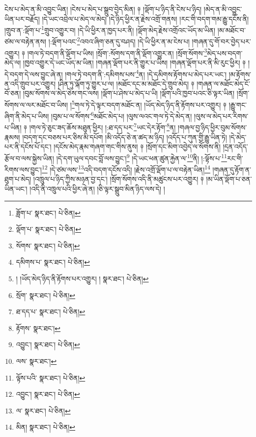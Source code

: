 ངེས་པ་མེད་ན་མི་འབྱུང་ཡིན། །ངེས་པ་མེད་པ་སྒྲུབ་བྱེད་མིན། ༈ །ལྡོག་པ་ཉིད་ནི་ངེས་པ་ཉིད། །མེད་ན་མི་འབྱུང་ཡིན་པར་བརྗོད། །དེ་ཡང་འབྲེལ་པ་མེད་ལ་མེད། །དེ་ཉིད་ཕྱིར་ན་རྗེས་འགྲོ་གནས། །རང་གི་བདག་གམ་རྒྱུ་དངོས་ནི། །གྲུབ་ན་:ལྡོག་པ་\footnote{ཟློག་པ་  སྣར་ཐང་།  པེ་ཅིན། }གྲུབ་འགྱུར་བ། །དེ་ཡི་ཕྱིར་ན་ཁྱད་པར་ནི། །ལྡོག་མེད་རྗེས་འགྲོའང་ཡོད་མ་ཡིན། །མ་མཐོང་བ་ཙམ་ལ་བརྟེན་ནས། །:ལྡོག་པའང་\footnote{ལྡོག་པ་  སྣར་ཐང་།  པེ་ཅིན། }འབའ་ཞིག་ཅན་དུ་བཤད། །དེ་ཡི་ཕྱིར་ན་མ་ངེས་པ། །གཞན་དུ་གོ་བར་བྱེད་པར་འགྱུར། ༈ །གལ་ཏེ་བདག་ནི་ལྡོག་པ་ཡིས། །སྲོག་:སོགས་དག་ནི་ལྡོག་འགྱུར་ན། །སྲོག་སོགས་\footnote{སོགས་  སྣར་ཐང་།  པེ་ཅིན། }མེད་པས་བདག་མེད་ལ། །ཁྱབ་འགྱུར་དེ་ཡང་ཡོད་མ་ཡིན། །གཞན་ལྡོག་པར་ནི་གྱུར་པ་ཡིས། །གཞན་ལྡོག་པར་ནི་མི་རུང་ཕྱིར། ༈ །དེ་བདག་དེ་ལས་བྱུང་ཞེ་ན། །གལ་ཏེ་བདག་ནི་:དམིགས་པས་\footnote{དམིགས་པ་  སྣར་ཐང་།  པེ་ཅིན། }ན། །དེ་དམིགས་རྟོགས་པ་མེད་པར་ཡང་། །མ་རྟོགས་ན་འདི་གྲུབ་པར་འགྱུར། །ཤིན་ཏུ་ལྐོག་ཏུ་གྱུར་པ་ལ། །མཐོང་དང་མ་མཐོང་དེ་གྲུབ་མེད། ༈ །གཞན་ལ་མཐོང་མེད་ངོ་བོ་ཅན། །བུམ་སོགས་ལ་མེད་ཅེས་གང་ལས། །ལྡོག་པ་ཤེས་པ་མེད་པ་ཡི། །ལྡོག་པའི་ཁྱབ་པའང་ཅི་ལྟར་ཡིན། །སྲོག་སོགས་ལ་ལར་མཐོང་བ་ཡིས། །\footnote{། །ཡོད་མེད་ཉིད་ནི་རྟོགས་པར་འགྱུར། །  སྣར་ཐང་།  པེ་ཅིན། }གལ་ཏེ་དེ་ལྟར་བདག་མཐོང་ན། །ཡོད་མེད་ཉིད་ནི་རྟོགས་པར་འགྱུར། ༈ །རྒྱུ་གང་ཞིག་ནི་མེད་པ་ཡིས། །བུམ་པ་ལ་སོགས་\footnote{སྲོག་  སྣར་ཐང་།  པེ་ཅིན། }མཐོང་མེད་པ། །ལུས་ལའང་གལ་ཏེ་དེ་མེད་ན། །ལུས་ལ་མེད་པར་རིགས་པ་ཡིན། ༈ །གལ་ཏེ་ཅུང་ཟད་ཆོས་མཐུན་ཕྱིར། །:ཐ་དད་པར་\footnote{ཐ་དད་པ་  སྣར་ཐང་།  པེ་ཅིན། }ཡང་དེར་རྟོག་\footnote{རྟོགས་  སྣར་ཐང་། }ན། །གཞལ་བྱ་ཉིད་ཕྱིར་བུམ་སོགས་རྣམས། །བདག་དང་བཅས་པར་ཅིས་མི་དཔོག །མི་འདོད་ཅེ་ན་ཚད་མ་ཉིད། །འདོད་པ་ཀུན་གྱི་རྒྱུ་ཡིན་ཏེ། །དེ་མེད་པར་ནི་དངོས་པོ་དང་། །དངོས་མེད་རྣམ་གཞག་གང་གིས་ནུས། ༈ །སྲོག་དང་མིག་འབྱེད་ལ་སོགས་ནི། །དྲན་འདོད་རྩོལ་བ་ལས་སྐྱེས་ཡིན། །དེ་དག་ཡུལ་དབང་བློ་ལས་བྱུང་།\footnote{འབྱུང་།  སྣར་ཐང་།  པེ་ཅིན། } །དེ་ཡང་ཕན་ཚུན་རྐྱེན་ལ་\footnote{ལས་  སྣར་ཐང་། }ནི། །:ལྟོས་པ་\footnote{ལྟོས་པའི་  སྣར་ཐང་།  པེ་ཅིན། }རང་གི་རིགས་ལས་བྱུང་།\footnote{འབྱུང་།  སྣར་ཐང་།  པེ་ཅིན། } །དེ་ཙམ་ལས་\footnote{ལ་  སྣར་ཐང་།  པེ་ཅིན། }འདི་བདག་དངོས་འདི། །རྗེས་འགྲོ་ལྡོག་པ་ལ་བརྟེན་ཡིན།\footnote{མིན།  སྣར་ཐང་།  པེ་ཅིན། } །གཞན་དུ་རྟོག་ན་ཐུག་པ་མེད། །འཁྲུལ་པ་ཉིད་ཀྱིས་མཉན་བྱ་དང་། །སྲོག་སོགས་འདི་ནི་མཚུངས་པར་འགྱུར། ༈ །མ་ཡིན་ལྡོག་པ་ཅན་ཡིན་ཡང་། །འདི་ནི་འཁྲུལ་པའི་ཕྱིར་ཞེ་ན། །ཅི་ལྟར་སྒྲུབ་མིན་ཉིད་ལས་དེ། །
